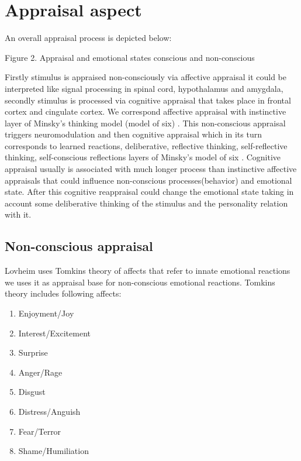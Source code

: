 \section{Appraisal aspect}

An overall appraisal process is depicted below:

\begin{center}
Figure 2. Appraisal and emotional states conscious and non-conscious
\end{center}

Firstly stimulus is appraised non-consciously via affective appraisal it could be interpreted like signal processing in spinal cord, hypothalamus and amygdala, secondly stimulus is processed via cognitive appraisal that takes place in frontal cortex and cingulate cortex. We correspond affective appraisal with instinctive layer of Minsky's thinking model (model of six) \cite{emotionmachine}. This non-conscious appraisal triggers neuromodulation \cite{cubeofemotions} and then cognitive appraisal which in its turn corresponds to learned reactions, deliberative, reflective thinking, self-reflective thinking, self-conscious reflections layers of Minsky's model of six \cite{computational_emotional_thinking}. Cognitive appraisal usually is associated with much longer process than instinctive affective appraisals that could influence non-conscious processes(behavior) and emotional state. After this cognitive reappraisal could change the emotional state taking in account some deliberative thinking of the stimulus and the personality relation with it.

\subsection{Non-conscious appraisal}

Lovheim uses Tomkins theory of affects that refer to innate emotional reactions we uses it as appraisal base for non-conscious emotional reactions. Tomkins theory \cite{tomkins1, tomkins2, tomkins3, quest} includes following affects:

\begin{enumerate}
 \item  Enjoyment/Joy
 \item  Interest/Excitement
 \item  Surprise
 \item  Anger/Rage
 \item  Disgust
 \item  Distress/Anguish
 \item  Fear/Terror
 \item  Shame/Humiliation
\end{enumerate}

